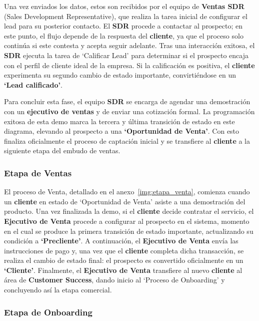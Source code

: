 Una vez enviados los datos, estos son recibidos por el equipo de \textbf{Ventas SDR} (Sales Development Representative), que realiza la tarea inicial de configurar el lead para su posterior contacto. El \textbf{SDR} procede a contactar al prospecto; en este punto, el flujo depende de la respuesta del \textbf{cliente}, ya que el proceso solo continúa si este contesta y acepta seguir adelante. Tras una interacción exitosa, el \textbf{SDR} ejecuta la tarea de `Calificar Lead' para determinar si el prospecto encaja con el perfil de cliente ideal de la empresa. Si la calificación es positiva, el \textbf{cliente} experimenta su segundo cambio de estado importante, convirtiéndose en un \textbf{`Lead calificado'}.

Para concluir esta fase, el equipo \textbf{SDR} se encarga de agendar una demostración con un \textbf{ejecutivo de ventas} y de enviar una cotización formal. La programación exitosa de esta demo marca la tercera y última transición de estado en este diagrama, elevando al prospecto a una \textbf{`Oportunidad de Venta'}. Con esto finaliza oficialmente el proceso de captación inicial y se transfiere al \textbf{cliente} a la siguiente etapa del embudo de ventas.

\subsubsection{Etapa de Ventas}

El proceso de Venta, detallado en el anexo~\ref{img:etapa_venta}, comienza cuando un \textbf{cliente} en estado de `Oportunidad de Venta' asiste a una demostración del producto. Una vez finalizada la demo, si el \textbf{cliente} decide contratar el servicio, el \textbf{Ejecutivo de Venta} procede a configurar al prospecto en el sistema, momento en el cual se produce la primera transición de estado importante, actualizando su condición a \textbf{`Precliente'}. A continuación, el \textbf{Ejecutivo de Venta} envía las instrucciones de pago y, una vez que el \textbf{cliente} completa dicha transacción, se realiza el cambio de estado final: el prospecto es convertido oficialmente en un \textbf{`Cliente'}. Finalmente, el \textbf{Ejecutivo de Venta} transfiere al nuevo \textbf{cliente} al área de \textbf{Customer Success}, dando inicio al `Proceso de Onboarding' y concluyendo así la etapa comercial.

\subsubsection{Etapa de Onboarding}

